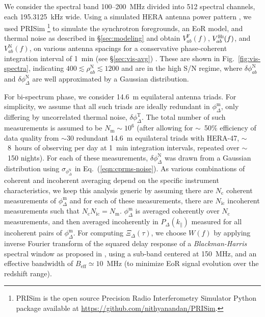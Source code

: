 \documentclass[
reprint,
superscriptaddress,
amsmath,
amssymb,
aps,
prd
]{revtex4-1}
\begin{document}
We consider the spectral band 100--200~MHz divided into 512 spectral channels, each 195.3125~kHz wide. Using a simulated HERA antenna power pattern \cite{deb17}, we used PRISim \footnote{PRISim is the open source Precision Radio Interferometry Simulator Python package available at \href{https://github.com/nithyanandan/PRISim}{https://github.com/nithyanandan/PRISim}.} to simulate the synchrotron foregrounds, an EoR model, and thermal noise as described in \S\ref{sec:modeling} and obtain $V_{ab}^\textrm{F}(f)$, $V_{ab}^\textrm{H{\sc i}}(f)$, and $V_{ab}^\textrm{N}(f)$, on various antenna spacings for a conservative phase-coherent integration interval of 1~min (see \S\ref{sec:vis-avg}) \cite{car18}. These are shown in Fig.~\ref{fig:vis-spectra}, indicating $400\lesssim \rho_{ab}^\textrm{N} \lesssim 1200$ and are in the high S/N regime, where $\delta\phi_{ab}^\textrm{N}$ and $\delta\phi_\Delta^\textrm{N}$ are well approximated by a Gaussian distribution. 

For bi-spectrum phase, we consider 14.6~m equilateral antenna triads. For simplicity, we assume that all such triads are ideally redundant in $\phi_\Delta^\textrm{m}$, only differing by uncorrelated thermal noise, $\delta\phi_\Delta^\textrm{T}$. The total number of such measurements is assumed to be $N_\textrm{m} \sim 10^6$ (after allowing for $\sim$~50\% efficiency of data quality from $\sim 30$ redundant 14.6~m equilateral triads with HERA-47, $\sim$~8~hours of observing per day at 1~min integration intervals, repeated over $\sim$~150 nights). For each of these measurements, $\delta\phi_\Delta^\textrm{N}$ was drawn from a Gaussian distribution using $\sigma_{\phi_\Delta^\textrm{N}}$ in Eq.~(\ref{eqn:cprms-noise}). As various combinations of coherent and incoherent averaging depend on the specific instrument characteristics, we keep this analysis generic by assuming there are $N_\textrm{c}$ coherent measurements of $\phi_\Delta^\textrm{m}$ and for each of these measurements, there are $N_\textrm{ic}$ incoherent measurements such that $N_\textrm{c}N_\textrm{ic}=N_\textrm{m}$. $\phi_\Delta^\textrm{m}$ is averaged coherently over $N_\textrm{c}$ measurements, and then averaged incoherently in $P_\Delta(k_\parallel)$ measured for all incoherent pairs of $\phi_\Delta^\textrm{m}$. For computing $\Xi_\Delta(\tau)$, we choose $W(f)$ by applying inverse Fourier transform of the squared delay response of a {\it Blackman-Harris} spectral window \cite{har78} as proposed in \cite{thy16}, using a sub-band centered at 150~MHz, and an effective bandwidth of $B_\textrm{eff}\simeq 10$~MHz (to minimize EoR signal evolution over the redshift range).
\end{document}
